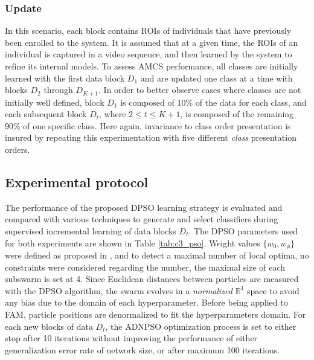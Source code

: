 \subsubsection{Update}

In this scenario, each block contains ROIs of individuals that have previously been enrolled to the system.
It is assumed that at a given time, the ROIs of an individual is captured in a video sequence, and then learned by the system to refine its internal models.
To assess AMCS performance, all classes are initially learned with the first data block $D_1$ and are updated one class at a time with blocks $D_2$ through $D_{K+1}$.
In order to better observe cases where classes are not initially well defined,
block $D_1$ is composed of $10\%$ of the data for each class, and each subsequent block $D_t$, where $2 \leq t \leq K+1$, is composed of the remaining $90\%$ of one specific class.
Here again, invariance to class order presentation is insured by repeating this experimentation with five different \emph{class} presentation orders.

\subsection{Experimental protocol}
\label{sec:c3_protocole}

The performance of the proposed DPSO learning strategy is evaluated and compared with various techniques to generate and select classifiers during supervised incremental learning of data blocks $D_t$.
The DPSO parameters used for both experiments are shown in Table \ref{tab:c3_pso}.
Weight values $\{w_0,w_\phi\}$ were defined as proposed in \cite{kennedy07}, and to detect a maximal number of local optima, no constraints were considered regarding the number, the maximal size of each subswarm is set at 4.
Since Euclidean distances between particles are measured with the DPSO algorithm, the swarm evolves in a \emph{normalized} $\mathbb{R}^4$ space to avoid any bias due to the domain of each hyperparameter.
Before being applied to FAM, particle positions are denormalized to fit the hyperparameters domain.
For each new blocks of data $D_t$, the ADNPSO optimization process is set to either stop after 10 iterations without improving the performance of either generalization error rate of network size, or after maximum 100 iterations.

